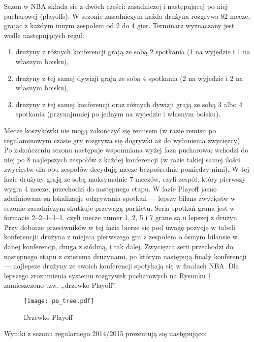 \documentclass[inzynierska]{pwr_wmat_praca_dyplomowa}
\theoremstyle{plain}
\numberwithin{theorem}{chapter}
\theoremstyle{definition}
\numberwithin{theorem}{chapter}
\begin{document}
Sezon w NBA składa się z dwóch części: zasadniczej i następującej po niej pucharowej (playoffs). W sezonie zasadniczym każda drużyna rozgrywa 82 mecze, grając z każdym innym zespołem od 2 do 4 gier. Terminarz wyznaczany jest wedle następujących reguł:
\begin{enumerate}
	\item drużyny z różnych konferencji grają ze sobą 2 spotkania (1 na wyjedzie i 1 na własnym boisku),
	\item drużyny z tej samej dywizji grają ze sobą 4 spotkania (2 na wyjedzie i 2 na własnym boisku),
	\item drużyny z tej samej konferencji oraz różnych dywizji grają ze sobą 3 albo 4 spotkania (przynajmniej po jednym na wyjedzie i własnym boisku).
\end{enumerate}
Mecze koszykówki nie mogą zakończyć się remisem (w razie remisu po regulaminowym czasie gry rozgrywa się dogrywki aż do wyłonienia zwycięzcy).
Po zakończeniu sezonu następuje wspomniana wyżej faza pucharowa; wchodzi do niej po 8 najlepszych zespołów z każdej konferencji (w razie takiej samej ilości zwycięstw dla obu zespołów decydują mecze bezpośrednie pomiędzy nimi). W tej fazie drużyny grają ze sobą maksymalnie 7 meczów, czyli zespół, który pierwszy wygra 4 mecze, przechodzi do następnego etapu. W fazie Playoff jasno zdefiniowane są lokalizacje odgrywania spotkań --- lepszy bilans zwycięstw w sezonie zasadniczym skutkuje przewagą parkietu. Seria spotkań grana jest w formacie 2–2–1–1–1, czyli mecze numer 1, 2, 5 i 7 grane są u lepszej z drużyn. Przy doborze przeciwników w tej fazie bierze się pod uwagę pozycję w tabeli konferencji: drużyna z miejsca pierwszego gra z zespołem o ósmym bilansie w danej konferencji, druga z siódmą, i tak dalej. Zwycięzca serii przechodzi do następnego etapu z czterema drużynami, po którym następują finały konferencji --- najlepsze drużyny ze swoich konferencji spotykają się w finałach NBA. Dla lepszego zrozumienia systemu rozgrywek pucharowych na Rysunku \ref{po_tree} zamieszczono tzw. ,,drzewko Playoff''.  

\begin{figure}[t]
	\texttt{[image: po\_tree.pdf]}
	\caption{Drzewko Playoff}\label{po_tree}
	\centering
\end{figure}

Wyniki z sezonu regularnego 2014/2015 prezentują się następująco:
\end{document}

